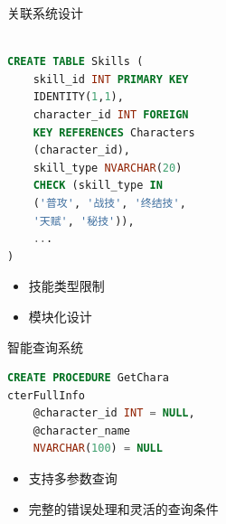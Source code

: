 \documentclass{beamer}
\begin{document}
\begin{frame}[fragile]{关联系统设计}
    \begin{minipage}{0.6\linewidth}
\begin{lstlisting}[language=sql]

CREATE TABLE Skills (
    skill_id INT PRIMARY KEY 
    IDENTITY(1,1),
    character_id INT FOREIGN 
    KEY REFERENCES Characters
    (character_id),
    skill_type NVARCHAR(20) 
    CHECK (skill_type IN 
    ('普攻', '战技', '终结技',
    '天赋', '秘技')),
    ...
)

\end{lstlisting}
    \end{minipage}\hspace{0.5cm}
    \begin{minipage}{0.25\linewidth}
        \begin{itemize}
            \item 技能类型限制
            \item 模块化设计
            
        \end{itemize}
    \end{minipage}
    \medskip
\end{frame}



\begin{frame}[fragile]{智能查询系统}
    \begin{minipage}{0.6\linewidth}
\begin{lstlisting}[language=sql]
CREATE PROCEDURE GetChara
cterFullInfo
    @character_id INT = NULL,
    @character_name 
    NVARCHAR(100) = NULL
\end{lstlisting}
    \end{minipage}\hspace{0.5cm}
    \begin{minipage}{0.25\linewidth}
        \begin{itemize}
            \item 支持多参数查询
            \item 完整的错误处理和灵活的查询条件
            
        \end{itemize}
    \end{minipage}
    \medskip
\end{frame}
\end{document}
